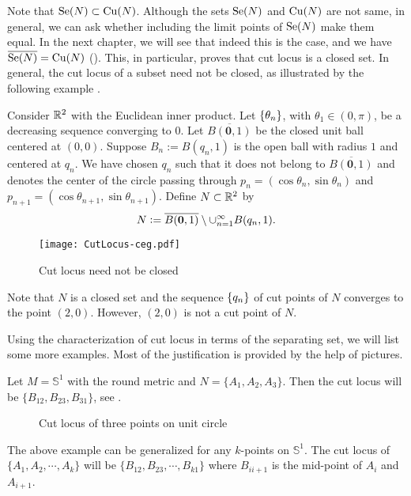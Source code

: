 \vspace{0.3cm}
\noindent Note that $\mathrm{Se}(N)\subset \mathrm{Cu}(N)$. Although the sets $\mathrm{Se}(N)$ and $\mathrm{Cu}(N)$ are not same, in general, we can ask whether including the limit points of $\mathrm{Se}(N)$ make them equal. In the next chapter, we will see that indeed this is the case, and we have $\overline{\mathrm{Se}(N)}=\mathrm{Cu}(N)$ (). \label{Page:SeClosureIsCu} This, in particular, proves that cut locus is a closed set. In general, the cut locus of a subset need not be closed, as illustrated by the following example \cite{TaSa16}.
\begin{eg}
    Consider $\mathbb{R}^2$ with the Euclidean inner product. Let $\left\{ \theta_n \right\}$, with $\theta_1\in (0,\pi)$, be a decreasing sequence converging to $0$. Let $\overline{B(\mathbf{0},1)}$ be the closed unit ball centered at $(0,0)$. Suppose $B_n:=B(q_n,1)$ is the open ball with radius $1$ and centered at $q_n$. We have chosen $q_n$ such that it does not belong to $\overline{B(\mathbf{0},1)}$ and denotes the center of the circle passing through $p_n=(\cos\theta_n,\sin\theta_n)$ and $p_{n+1} = (\cos\theta_{n+1},\sin\theta_{n+1})$. Define $ N\subset \mathbb{R}^2$ by
    \begin{displaymath}
        N \vcentcolon= \overline{B(\mathbf{0},1)}\setminus \cup_{n=1}^\infty B(q_n,1).
    \end{displaymath}
    \begin{figure}[!htpb]
        \centering
        \texttt{[image: CutLocus-ceg.pdf]}
        \caption{Cut locus need not be closed}
        \label{fig:CutLocusNotClosed}
    \end{figure}
    
    \noindent Note that $N$ is a closed set and the sequence $\left\{ q_n \right\}$ of cut points of $N$ converges to the point $(2,0)$. However, $(2,0)$ is not a cut point of $N$.
\end{eg}

\hf Using the characterization of cut locus in terms of the separating set, we will list some more examples. Most of the justification is provided by the help of pictures. 

\begin{eg}
    Let $M=\mathbb{S}^1$ with the round metric and $N=\{A_1,A_2,A_3\}$. Then the cut locus will be $\{B_{12},B_{23},B_{31}\}$, see .
    \begin{figure}[!htpb]
        \centering
        \caption{Cut locus of three points on unit circle \label{fig:Example-CutLocus-CircleThreePoints}}
    \end{figure}
    The above example can be generalized for any $k$-points on $\mathbb{S}^1$. The cut locus of $\{A_1,A_2,\cdots,A_k\}$ will be $\{B_{12},B_{23},\cdots, B_{k1}\}$ where $B_{i i+1}$ is the mid-point of $A_i$  and $A_{i+1}$.
\end{eg}

